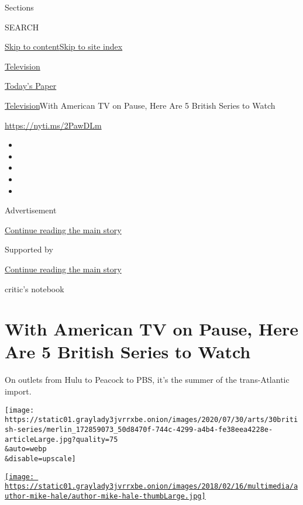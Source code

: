 Sections

SEARCH

\protect\hyperlink{site-content}{Skip to
content}\protect\hyperlink{site-index}{Skip to site index}

\href{https://www.nytimes3xbfgragh.onion/section/arts/television}{Television}

\href{https://myaccount.nytimes3xbfgragh.onion/auth/login?response_type=cookie\&client_id=vi}{}

\href{https://www.nytimes3xbfgragh.onion/section/todayspaper}{Today's
Paper}

\href{/section/arts/television}{Television}\textbar{}With American TV on
Pause, Here Are 5 British Series to Watch

\url{https://nyti.ms/2PawDLm}

\begin{itemize}
\item
\item
\item
\item
\item
\end{itemize}

Advertisement

\protect\hyperlink{after-top}{Continue reading the main story}

Supported by

\protect\hyperlink{after-sponsor}{Continue reading the main story}

critic's notebook

\hypertarget{with-american-tv-on-pause-here-are-5-british-series-to-watch}{%
\section{With American TV on Pause, Here Are 5 British Series to
Watch}\label{with-american-tv-on-pause-here-are-5-british-series-to-watch}}

On outlets from Hulu to Peacock to PBS, it's the summer of the
trans-Atlantic import.

\texttt{[image: https://static01.graylady3jvrrxbe.onion/images/2020/07/30/arts/30british-series/merlin\_172859073\_50d8470f-744c-4299-a4b4-fe38eea4228e-articleLarge.jpg?quality=75\\\&auto=webp\\\&disable=upscale]}

\href{https://www.nytimes3xbfgragh.onion/by/mike-hale}{\texttt{[image: https://static01.graylady3jvrrxbe.onion/images/2018/02/16/multimedia/author-mike-hale/author-mike-hale-thumbLarge.jpg]}}

